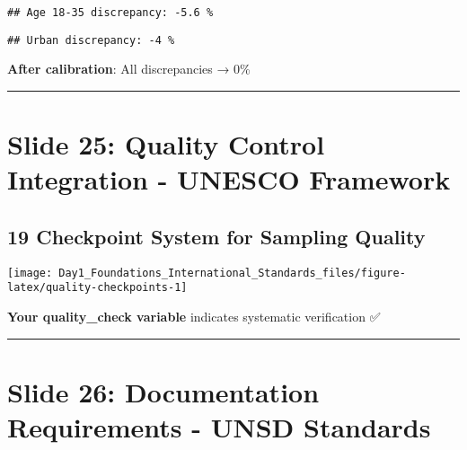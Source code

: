 \documentclass[
]{article}
\newenvironment{Shaded}{\begin{snugshade}}{\end{snugshade}}
\newcommand{\DecValTok}[1]{\textcolor[rgb]{0.00,0.00,0.81}{#1}}
\newcommand{\FunctionTok}[1]{\textcolor[rgb]{0.13,0.29,0.53}{\textbf{#1}}}
\newcommand{\NormalTok}[1]{#1}
\newcommand{\SpecialCharTok}[1]{\textcolor[rgb]{0.81,0.36,0.00}{\textbf{#1}}}
\newcommand{\StringTok}[1]{\textcolor[rgb]{0.31,0.60,0.02}{#1}}
\begin{document}
\begin{verbatim}
## Age 18-35 discrepancy: -5.6 %
\end{verbatim}

\begin{Shaded}
\end{Shaded}

\begin{verbatim}
## Urban discrepancy: -4 %
\end{verbatim}

\textbf{After calibration}: All discrepancies → 0\%

\begin{center}\rule{0.5\linewidth}{0.5pt}\end{center}

\section{Slide 25: Quality Control Integration - UNESCO
Framework}\label{slide-25-quality-control-integration---unesco-framework}

\subsection{19 Checkpoint System for Sampling
Quality}\label{checkpoint-system-for-sampling-quality}

\texttt{[image: Day1\_Foundations\_International\_Standards\_files/figure-latex/quality-checkpoints-1]}

\textbf{Your quality\_check variable} indicates systematic verification
✅

\begin{center}\rule{0.5\linewidth}{0.5pt}\end{center}

\section{Slide 26: Documentation Requirements - UNSD
Standards}\label{slide-26-documentation-requirements---unsd-standards}
\end{document}
